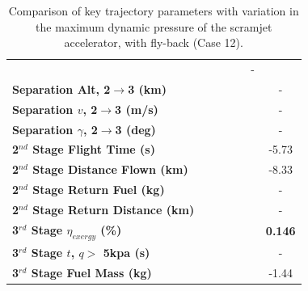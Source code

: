 \begin{table}[ht]
\begin{tabular}{l c c c c c c}
		& \textbf{\secondExergyEffqFortyFive}
		& \textbf{\secondExergyEffqStandard}
		& \textbf{\secondExergyEffqFiftyFive}
		& \textbf{\secondExergyEffqSixty}
		& -
		\\
		\textbf{Separation Alt, 2$\rightarrow$3 (km)}
		& \secondthirdSeparationAltqForty
		& \secondthirdSeparationAltqFortyFive
		& \secondthirdSeparationAltqStandard
		& \secondthirdSeparationAltqFiftyFive
		& \secondthirdSeparationAltqSixty
		& -
		\\
		\textbf{Separation $v$, 2$\rightarrow$3 (m/s)}
		& \secondthirdSeparationvqForty
		& \secondthirdSeparationvqFortyFive
		& \secondthirdSeparationvqStandard
		& \secondthirdSeparationvqFiftyFive
		& \secondthirdSeparationvqSixty
		& -
		\\
		\textbf{Separation $\gamma$, 2$\rightarrow$3 (deg)}
		& \secondthirdSeparationgammaqForty
		& \secondthirdSeparationgammaqFortyFive
		& \secondthirdSeparationgammaqStandard
		& \secondthirdSeparationgammaqFiftyFive
		& \secondthirdSeparationgammaqSixty
		& -
		\\
		\textbf{2$^{nd}$ Stage Flight Time (s)}
		& \secondFlightTimeqForty
		& \secondFlightTimeqFortyFive
		& \secondFlightTimeqStandard
		& \secondFlightTimeqFiftyFive
		& \secondFlightTimeqSixty
		&-5.73
		\\
		\textbf{2$^{nd}$ Stage Distance Flown (km)}
		& \SecondDistqForty
		& \SecondDistqFortyFive
		& \SecondDistqStandard
		& \SecondDistqFiftyFive
		& \SecondDistqSixty
		&-8.33
		\\
		\textbf{2$^{nd}$ Stage Return Fuel (kg)}
		& \returnFuelqForty
		& \returnFuelqFortyFive
		& \returnFuelqStandard
		& \returnFuelqFiftyFive
		& \returnFuelqSixty
		& -
		\\
		\textbf{2$^{nd}$ Stage Return Distance (km)}
		& \returnDistqForty
		& \returnDistqFortyFive
		& \returnDistqStandard
		& \returnDistqFiftyFive
		& \returnDistqSixty
		& -
		\\
		\hline 
		\textbf{3$^{rd}$ Stage $\eta_{exergy}$ (\%)}
		& \textbf{\thirddExergyEffqForty}
		& \textbf{\thirddExergyEffqFortyFive}
		& \textbf{\thirddExergyEffqStandard}
		& \textbf{\thirddExergyEffqFiftyFive}
		& \textbf{\thirddExergyEffqSixty}
		& \textbf{0.146}
		\\
		\textbf{3$^{rd}$ Stage $t$, $q >$ 5kpa (s)}
		& \thirdqOverFiveqForty
		& \thirdqOverFiveqFortyFive
		& \thirdqOverFiveqStandard
		& \thirdqOverFiveqFiftyFive
		& \thirdqOverFiveqSixty
		& -
		\\
		\textbf{3$^{rd}$ Stage Fuel Mass (kg)}
		& \thirdmFuelqForty
		& \thirdmFuelqFortyFive
		& \thirdmFuelqStandard
		& \thirdmFuelqFiftyFive
		& \thirdmFuelqSixty
		&-1.44
		\\
		\hline 
	\end{tabular} 
	\caption{Comparison of key trajectory parameters with variation in the maximum dynamic pressure of the scramjet accelerator, with fly-back (Case 12).}
	\label{tab:qvarreturn}
\end{table}


